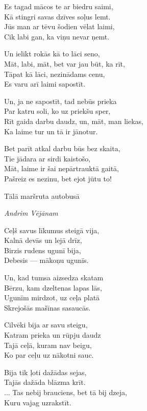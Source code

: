 \documentclass[14pt]{extarticle}
\begin{document}
{{Es tagad mācos te ar biedru saimi,\\
Kā stingri savas dzīves soļus lemt.\\
Jūs man ar tēvu šodien vēlat laimi,\\
Cik labi gan, ka viņu nevar ņemt.

Un ielikt rokās kā to lāci seno,\\
Māt, labi, māt, bet var jau būt, ka rīt,\\
Tāpat kā lāci, nezinādams cenu,\\
Es varu arī laimi sapostīt. 

Un, ja ne sapostīt, tad nebūs prieka\\
Par katru soli, ko uz priekšu sper,\\
Rīt gaida darbu daudz, un, māt, man liekas,\\
Ka laime tur un tā ir jānotur. 

Bet parīt atkal darbu būs bez skaita,\\
Tie jādara ar sirdi kaistošo,\\
Māt, laime ir šai nepārtrauktā gaitā,\\
Pašreiz es nezinu, bet ejot jūtu to!



\newpage

{\large \sc Tālā maršruta autobusā}

{\em Andrim Vējānam}

Ceļš savus līkumus steigā vija,\\
Kalnā devās un lejā drīz,\\
Birzis rudens ugunī bija,\\
Debesis --- mākoņu ugunīs. 

Un, kad tumsa aizsedza skatam\\
Bērzu, kam dzeltenas lapas lās,\\
Ugunīm mirdzot, uz ceļa platā\\
Skrejošās mašīnas sasaucās. 

Cilvēki bija ar savu steigu,\\
Katram prieka un rūpju daudz\\
Tajā ceļā, kuram nav beigu,\\
Ko par ceļu uz nākotni sauc. 

Bija tik ļoti dažādas sejas,\\
Tajās dažāda blāzma krīt.\\
... Tas nebij brauciens, bet tā bij dzeja,\\
Kuru vajag uzrakstīt. 

}}
\end{document}
